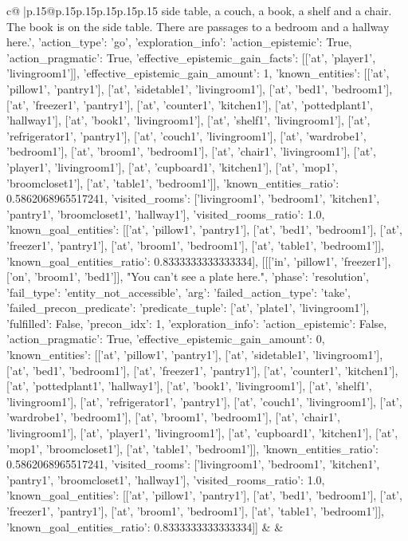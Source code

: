 \documentclass{article}
\begin{document}
{\begin{supertabular}{c@{$\;$}|p{.15\linewidth}@{}p{.15\linewidth}p{.15\linewidth}p{.15\linewidth}p{.15\linewidth}p{.15\linewidth}}
{{{side table, a couch, a book, a shelf and a chair. The book is on the side table. There are passages to a bedroom and a hallway here.', {'action_type': 'go', 'exploration_info': {'action_epistemic': True, 'action_pragmatic': True, 'effective_epistemic_gain_facts': [['at', 'player1', 'livingroom1']], 'effective_epistemic_gain_amount': 1, 'known_entities': [['at', 'pillow1', 'pantry1'], ['at', 'sidetable1', 'livingroom1'], ['at', 'bed1', 'bedroom1'], ['at', 'freezer1', 'pantry1'], ['at', 'counter1', 'kitchen1'], ['at', 'pottedplant1', 'hallway1'], ['at', 'book1', 'livingroom1'], ['at', 'shelf1', 'livingroom1'], ['at', 'refrigerator1', 'pantry1'], ['at', 'couch1', 'livingroom1'], ['at', 'wardrobe1', 'bedroom1'], ['at', 'broom1', 'bedroom1'], ['at', 'chair1', 'livingroom1'], ['at', 'player1', 'livingroom1'], ['at', 'cupboard1', 'kitchen1'], ['at', 'mop1', 'broomcloset1'], ['at', 'table1', 'bedroom1']], 'known_entities_ratio': 0.5862068965517241, 'visited_rooms': ['livingroom1', 'bedroom1', 'kitchen1', 'pantry1', 'broomcloset1', 'hallway1'], 'visited_rooms_ratio': 1.0, 'known_goal_entities': [['at', 'pillow1', 'pantry1'], ['at', 'bed1', 'bedroom1'], ['at', 'freezer1', 'pantry1'], ['at', 'broom1', 'bedroom1'], ['at', 'table1', 'bedroom1']], 'known_goal_entities_ratio': 0.8333333333333334}}], [[['in', 'pillow1', 'freezer1'], ['on', 'broom1', 'bed1']], "You can't see a plate here.", {'phase': 'resolution', 'fail_type': 'entity_not_accessible', 'arg': {'failed_action_type': 'take', 'failed_precon_predicate': {'predicate_tuple': ['at', 'plate1', 'livingroom1'], 'fulfilled': False, 'precon_idx': 1}}, 'exploration_info': {'action_epistemic': False, 'action_pragmatic': True, 'effective_epistemic_gain_amount': 0, 'known_entities': [['at', 'pillow1', 'pantry1'], ['at', 'sidetable1', 'livingroom1'], ['at', 'bed1', 'bedroom1'], ['at', 'freezer1', 'pantry1'], ['at', 'counter1', 'kitchen1'], ['at', 'pottedplant1', 'hallway1'], ['at', 'book1', 'livingroom1'], ['at', 'shelf1', 'livingroom1'], ['at', 'refrigerator1', 'pantry1'], ['at', 'couch1', 'livingroom1'], ['at', 'wardrobe1', 'bedroom1'], ['at', 'broom1', 'bedroom1'], ['at', 'chair1', 'livingroom1'], ['at', 'player1', 'livingroom1'], ['at', 'cupboard1', 'kitchen1'], ['at', 'mop1', 'broomcloset1'], ['at', 'table1', 'bedroom1']], 'known_entities_ratio': 0.5862068965517241, 'visited_rooms': ['livingroom1', 'bedroom1', 'kitchen1', 'pantry1', 'broomcloset1', 'hallway1'], 'visited_rooms_ratio': 1.0, 'known_goal_entities': [['at', 'pillow1', 'pantry1'], ['at', 'bed1', 'bedroom1'], ['at', 'freezer1', 'pantry1'], ['at', 'broom1', 'bedroom1'], ['at', 'table1', 'bedroom1']], 'known_goal_entities_ratio': 0.8333333333333334}}]] 
	  } 
	   } 
	   } 
	 & & \\ 
 


\end{supertabular}}
\end{document}

